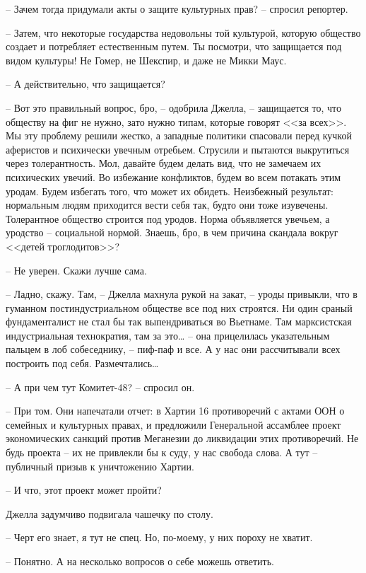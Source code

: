 -- Зачем тогда придумали акты о защите культурных прав? -- спросил репортер.

-- Затем, что некоторые государства недовольны той культурой, которую общество создает и потребляет естественным путем. Ты посмотри, что защищается под видом культуры! Не Гомер, не Шекспир, и даже не Микки Маус.

-- А действительно, что защищается?

-- Вот это правильный вопрос, бро, -- одобрила Джелла, -- защищается то, что обществу на фиг не нужно, зато нужно типам, которые говорят <<за всех>>. Мы эту проблему решили жестко, а западные политики спасовали перед кучкой аферистов и психически увечным отребьем. Струсили и пытаются выкрутиться через толерантность. Мол, давайте будем делать вид, что не замечаем их психических увечий. Во избежание конфликтов, будем во всем потакать этим уродам. Будем избегать того, что может их обидеть. Неизбежный результат: нормальным людям приходится вести себя так, будто они тоже изувечены. Толерантное общество строится под уродов. Норма объявляется увечьем, а уродство -- социальной нормой. Знаешь, бро, в чем причина скандала вокруг <<детей троглодитов>>?

-- Не уверен. Скажи лучше сама.

-- Ладно, скажу. Там, -- Джелла махнула рукой на закат, -- уроды привыкли, что в гуманном постиндустриальном обществе все под них строятся. Ни один сраный фундаменталист не стал бы так выпендриваться во Вьетнаме. Там марксистская индустриальная технократия, там за это\ldots{} -- она прицелилась указательным пальцем в лоб собеседнику, -- пиф-паф и все. А у нас они рассчитывали всех построить под себя. Размечтались\ldots{}

-- А при чем тут Комитет-48? -- спросил он.

-- При том. Они напечатали отчет: в Хартии 16 противоречий с актами ООН о семейных и культурных правах, и предложили Генеральной ассамблее проект экономических санкций против Меганезии до ликвидации этих противоречий. Не будь проекта -- их не привлекли бы к суду, у нас свобода слова. А тут -- публичный призыв к уничтожению Хартии.

-- И что, этот проект может пройти?

Джелла задумчиво подвигала чашечку по столу.

-- Черт его знает, я тут не спец. Но, по-моему, у них пороху не хватит.

-- Понятно. А на несколько вопросов о себе можешь ответить.


